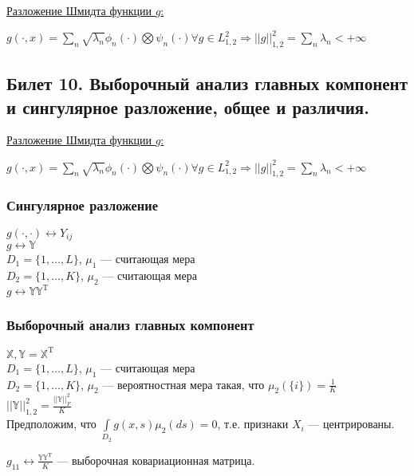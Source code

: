 \underline{Разложение Шмидта функции $g$:}

$g(\cdot,x) = \sum \limits_{n} \sqrt{\lambda_n} \phi_n (\cdot) \bigotimes \psi_n (\cdot) \forall g \in L_{1,2}^2 \Rightarrow ||g||_{1,2}^2 = \sum \limits_{n} \lambda_n < +\infty$

\subsection{Билет 10. Выборочный анализ главных компонент и сингулярное разложение, общее и различия.}

\underline{Разложение Шмидта функции $g$:}

$g(\cdot,x) = \sum \limits_{n} \sqrt{\lambda_n} \phi_n (\cdot) \bigotimes \psi_n (\cdot) \forall g \in L_{1,2}^2 \Rightarrow ||g||_{1,2}^2 = \sum \limits_{n} \lambda_n < +\infty$



\subsubsection{Сингулярное разложение}

$g(\cdot , \cdot) \leftrightarrow Y_{ij}$\\
$g \leftrightarrow \mathbb{Y}$\\

$D_1 = \{1, \dots, L\}$, $\mu_1$ --- считающая мера\\
$D_2 = \{1, \dots, K\}$, $\mu_2$ --- считающая мера\\

$g \leftrightarrow \mathbb{Y}\mathbb{Y}^{\mathrm{T}}$

\subsubsection{Выборочный анализ главных компонент}

$\mathbb{X}, \mathbb{Y} = \mathbb{X}^{\mathrm{T}}$\\
$D_1 = \{1, \dots, L\}$, $\mu_1$ --- считающая мера\\
$D_2 = \{1, \dots, K\}$, $\mu_2$ --- вероятностная мера такая, что $\mu_2(\{i\}) = \frac{1}{K}$\\
$||\mathbb{Y}||_{1,2}^2 = \frac{||\mathbb{Y}||_{F}^2}{K}$\\
Предположим, что $\int \limits_{D_2}g(x,s) \mu_2(ds) = 0$, т.е. признаки $X_i$ --- центрированы.

$g_{11} \leftrightarrow \frac{\mathbb{Y}\mathbb{Y}^{\mathrm{T}}}{K}$ --- выборочная ковариационная матрица.\\

